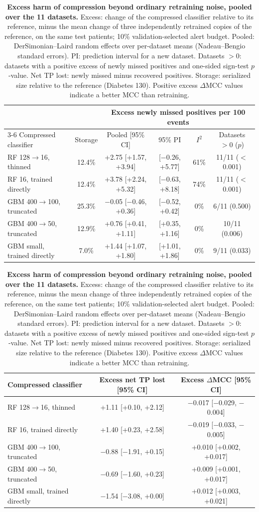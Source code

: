 \begin{table}[!htb]
\centering
\caption{\textbf{Excess harm of compression beyond ordinary retraining noise, pooled over the 11 datasets.} Excess: change of the compressed classifier relative to its reference, minus the mean change of three independently retrained copies of the reference, on the same test patients; 10\% validation-selected alert budget. Pooled: DerSimonian--Laird random effects over per-dataset means (Nadeau--Bengio standard errors). PI: prediction interval for a new dataset. Datasets $>0$: datasets with a positive excess of newly missed positives and one-sided sign-test $p$-value. Net TP lost: newly missed minus recovered positives. Storage: serialized size relative to the reference (Diabetes 130). Positive excess $\Delta$MCC values indicate a better MCC than retraining.}
\label{tab:META}
{\small
\begin{tabular}{lccccc}
\toprule
 & & \multicolumn{4}{c}{Excess newly missed positives per 100 events} \\
\cmidrule(l){3-6}
\rowcolor{white}Compressed classifier & Storage & Pooled [95\% CI] & 95\% PI & $I^2$ & Datasets $>0$ ($p$) \\
\midrule
RF 128$\rightarrow$16, thinned & 12.4\% & +2.75 [+1.57, +3.94] & [$-$0.26, +5.77] & 61\% & 11/11 ($<$0.001) \\
RF 16, trained directly & 12.4\% & +3.78 [+2.24, +5.32] & [$-$0.63, +8.18] & 74\% & 11/11 ($<$0.001) \\
GBM 400$\rightarrow$100, truncated & 25.3\% & $-$0.05 [$-$0.46, +0.36] & [$-$0.52, +0.42] & 0\% & 6/11 (0.500) \\
GBM 400$\rightarrow$50, truncated & 12.9\% & +0.76 [+0.41, +1.11] & [+0.35, +1.16] & 0\% & 10/11 (0.006) \\ GBM small, trained directly & 7.0\% & +1.44 [+1.07, +1.80] & [+1.01, +1.86] & 0\% & 9/11 (0.033) \\
\bottomrule
\end{tabular}
\par\vspace{1.2em}
\begin{tabular}{lcc}
\toprule
Compressed classifier & Excess net TP lost [95\% CI] & Excess $\Delta$MCC [95\% CI] \\
\midrule
RF 128$\rightarrow$16, thinned & +1.11 [+0.10, +2.12] & $-$0.017 [$-$0.029, $-$0.004] \\
RF 16, trained directly & +1.40 [+0.23, +2.58] & $-$0.019 [$-$0.033, $-$0.005] \\
GBM 400$\rightarrow$100, truncated & $-$0.88 [$-$1.91, +0.15] & +0.010 [+0.002, +0.017] \\
GBM 400$\rightarrow$50, truncated & $-$0.69 [$-$1.60, +0.23] & +0.009 [+0.001, +0.017] \\ GBM small, trained directly & $-$1.54 [$-$3.08, +0.00] & +0.012 [+0.003, +0.021] \\
\bottomrule
\end{tabular}
}
\end{table}
